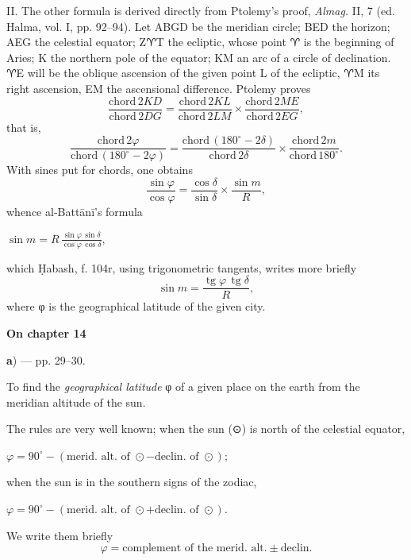 \documentclass[11pt]{article}
\newcommand{\Pg}[1]{\marginpar{\footnotesize\color{gray}#1}}
\newcommand{\UnitHead}[2]{\par\setcounter{footnoteT}{0}\needspace{8\baselineskip}\bigskip\pdfbookmark[1]{#1}{unit-#2}\hypertarget{EN-#2}{}%
 {\large\bfseries\interlinepenalty=10000 #1\par}\nobreak\medskip}
\begin{document}
\par \Pg{I 189}II. The other formula is derived directly from Ptolemy's proof, \emph{Almag.} II, 7 (ed. Halma, vol. I, pp. 92–94). Let ABGD be the meridian circle; BED the horizon; AEG the celestial equator; Z{\MoonFont\upshape ♈}T the ecliptic, whose point {\MoonFont\upshape ♈} is the beginning of Aries; K the northern pole of the equator; KM an arc of a circle of declination. {\MoonFont\upshape ♈}E will be the oblique ascension of the given point L of the ecliptic, {\MoonFont\upshape ♈}M its right ascension, EM the ascensional difference. Ptolemy proves \[ \frac{\text{chord}\,2KD}{\text{chord}\,2DG} = \frac{\text{chord}\,2KL}{\text{chord}\,2LM} \times \frac{\text{chord}\,2ME}{\text{chord}\,2EG}, \] that is, \[ \frac{\text{chord}\,2\varphi}{\text{chord}\,(180^\circ - 2\varphi)} = \frac{\text{chord}\,(180^\circ - 2\delta)}{\text{chord}\,2\delta} \times \frac{\text{chord}\,2m}{\text{chord}\,180^\circ}. \] With sines put for chords, one obtains \[ \frac{\sin\varphi}{\cos\varphi} = \frac{\cos\delta}{\sin\delta} \times \frac{\sin m}{R}, \] whence al-Battānī's formula \par\noindent\hspace*{1.5em}$\displaystyle \sin m = R\,\frac{\sin\varphi\,\sin\delta}{\cos\varphi\,\cos\delta},$\par which Ḥabash, f. 104r, using trigonometric tangents, writes more briefly \[ \sin m = \frac{\operatorname{tg}\varphi\,\operatorname{tg}\delta}{R}, \] where {\greekfont φ} is the geographical latitude of the given city.\par
\UnitHead{On chapter 14}{A14}
\par\begin{center}\textbf{a}) — pp. 29–30.\end{center}
\par To find the \emph{geographical latitude} {\greekfont φ} of a given place on the earth from the meridian altitude of the sun.\par
\par The rules are very well known; when the sun ({\MoonFont\upshape ⊙}) is north of the celestial equator, \par\noindent\hspace*{1.5em}$\displaystyle \varphi = 90^\circ - (\text{merid. alt. of }\odot - \text{declin. of }\odot);$\par when the sun is in the southern signs of the zodiac, \par\noindent\hspace*{1.5em}$\displaystyle \varphi = 90^\circ - (\text{merid. alt. of }\odot + \text{declin. of }\odot).$\par We write them briefly \[ \varphi = \text{complement of the merid. alt.} \pm \text{declin.} \]\par
\end{document}
